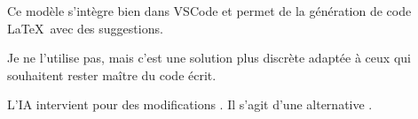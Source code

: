 \begin{Aide}
    Ce modèle s'intègre bien dans VSCode et permet de la génération de code \LaTeX\ avec des suggestions. 

    Je ne l'utilise pas, mais c'est une solution plus discrète adaptée à ceux qui souhaitent rester maître du code écrit. 
    
    L'IA intervient pour  des modifications . Il s'agit d'une alternative .
\end{Aide}

